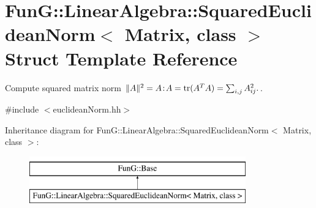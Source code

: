 \hypertarget{structFunG_1_1LinearAlgebra_1_1SquaredEuclideanNorm}{\section{Fun\-G\-:\-:Linear\-Algebra\-:\-:Squared\-Euclidean\-Norm$<$ Matrix, class $>$ Struct Template Reference}
\label{structFunG_1_1LinearAlgebra_1_1SquaredEuclideanNorm}
}


Compute squared matrix norm $ \|A\|^2 = A\negthinspace : \negthinspace A = \mathrm{tr}(A^TA) = \sum_{i,j} A_{ij}^2. $.  




{\ttfamily \#include $<$euclidean\-Norm.\-hh$>$}

Inheritance diagram for Fun\-G\-:\-:Linear\-Algebra\-:\-:Squared\-Euclidean\-Norm$<$ Matrix, class $>$\-:\begin{figure}[H]
\begin{center}
\leavevmode
\includegraphics[height=2.000000cm]{structFunG_1_1LinearAlgebra_1_1SquaredEuclideanNorm}
\end{center}
\end{figure}
